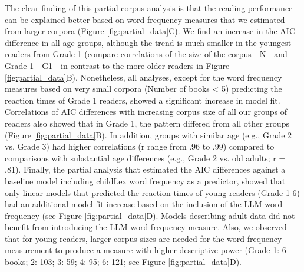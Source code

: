 \documentclass[doc, a4paper]{apa7}
\begin{document}
The clear finding of this partial corpus analysis is that the reading performance can be explained better based on word frequency measures that we estimated from larger corpora (Figure \ref{fig:partial_data}C). We find an increase in the AIC difference in all age groups, although the trend is much smaller in the youngest readers from Grade 1 (compare correlations of the size of the corpus - N - and Grade 1 - G1 - in contrast to the more older readers in Figure \ref{fig:partial_data}B). Nonetheless, all analyses, except for the word frequency measures based on very small corpora (Number of books < 5) predicting the reaction times of Grade 1 readers, showed a significant increase in model fit. Correlations of AIC differences with increasing corpus size of all our groups of readers also showed that in Grade 1, the pattern differed from all other groups (Figure \ref{fig:partial_data}B). In addition, groups with similar age (e.g., Grade 2 vs. Grade 3) had higher correlations (r range from .96 to .99) compared to comparisons with substantial age differences (e.g., Grade 2 vs. old adults; r = .81). Finally, the partial analysis that estimated the AIC differences against a baseline model including childLex word frequency as a predictor, showed that only linear models that predicted the reaction times of young readers (Grade 1-6) had an additional model fit increase based on the inclusion of the LLM word frequency (see Figure \ref{fig:partial_data}D). Models describing adult data did not benefit from introducing the LLM word frequency measure. Also, we observed that for young readers, larger corpus sizes are needed for the word frequency measurement to produce a measure with higher descriptive power (Grade 1: 6 books; 2: 103; 3: 59; 4: 95; 6: 121; see Figure \ref{fig:partial_data}D).
\end{document}
